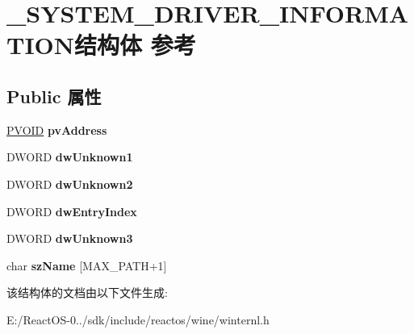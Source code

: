 \hypertarget{struct___s_y_s_t_e_m___d_r_i_v_e_r___i_n_f_o_r_m_a_t_i_o_n}{}\section{\+\_\+\+S\+Y\+S\+T\+E\+M\+\_\+\+D\+R\+I\+V\+E\+R\+\_\+\+I\+N\+F\+O\+R\+M\+A\+T\+I\+O\+N结构体 参考}
\label{struct___s_y_s_t_e_m___d_r_i_v_e_r___i_n_f_o_r_m_a_t_i_o_n}
\subsection*{Public 属性}
\begin{DoxyCompactItemize}
\item 
\mbox{\label{struct___s_y_s_t_e_m___d_r_i_v_e_r___i_n_f_o_r_m_a_t_i_o_n_a7f6e1d511a197a24427de4cf98e3aa47}} 
\hyperlink{interfacevoid}{P\+V\+O\+ID} {\bfseries pv\+Address}
\item 
\mbox{\label{struct___s_y_s_t_e_m___d_r_i_v_e_r___i_n_f_o_r_m_a_t_i_o_n_ad1eb0eab8be11f85f81d834a70553259}} 
D\+W\+O\+RD {\bfseries dw\+Unknown1}
\item 
\mbox{\label{struct___s_y_s_t_e_m___d_r_i_v_e_r___i_n_f_o_r_m_a_t_i_o_n_a9456f68de400823c083283880637ccad}} 
D\+W\+O\+RD {\bfseries dw\+Unknown2}
\item 
\mbox{\label{struct___s_y_s_t_e_m___d_r_i_v_e_r___i_n_f_o_r_m_a_t_i_o_n_a307164b3a742238d97eead1dbe019f39}} 
D\+W\+O\+RD {\bfseries dw\+Entry\+Index}
\item 
\mbox{\label{struct___s_y_s_t_e_m___d_r_i_v_e_r___i_n_f_o_r_m_a_t_i_o_n_a0c679583f96ed1ba1bacd3fb891df03a}} 
D\+W\+O\+RD {\bfseries dw\+Unknown3}
\item 
\mbox{\label{struct___s_y_s_t_e_m___d_r_i_v_e_r___i_n_f_o_r_m_a_t_i_o_n_a25a9f0109fd6ea9f5e23e6d2b0fbf71e}} 
char {\bfseries sz\+Name} \mbox{[}M\+A\+X\+\_\+\+P\+A\+TH+1\mbox{]}
\end{DoxyCompactItemize}


该结构体的文档由以下文件生成\+:\begin{DoxyCompactItemize}
\item 
E\+:/\+React\+O\+S-\/0../sdk/include/reactos/wine/winternl.\+h\end{DoxyCompactItemize}
